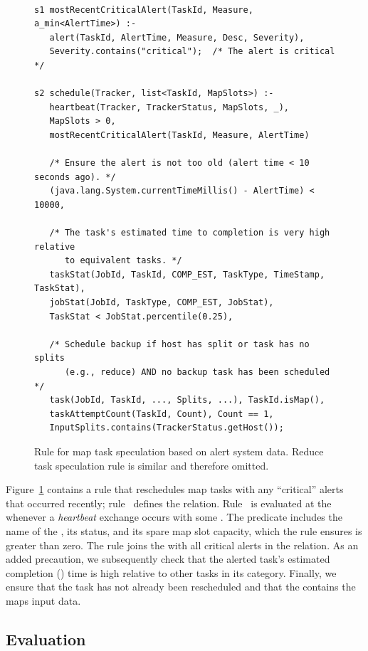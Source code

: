 \begin{figure}
\ssp
\centering
\begin{lstlisting}

s1 mostRecentCriticalAlert(TaskId, Measure, a_min<AlertTime>) :-
   alert(TaskId, AlertTime, Measure, Desc, Severity),
   Severity.contains("critical");  /* The alert is critical */

s2 schedule(Tracker, list<TaskId, MapSlots>) :-
   heartbeat(Tracker, TrackerStatus, MapSlots, _),
   MapSlots > 0,
   mostRecentCriticalAlert(TaskId, Measure, AlertTime)

   /* Ensure the alert is not too old (alert time < 10 seconds ago). */
   (java.lang.System.currentTimeMillis() - AlertTime) < 10000,

   /* The task's estimated time to completion is very high relative
      to equivalent tasks. */
   taskStat(JobId, TaskId, COMP_EST, TaskType, TimeStamp, TaskStat),
   jobStat(JobId, TaskType, COMP_EST, JobStat),
   TaskStat < JobStat.percentile(0.25),

   /* Schedule backup if host has split or task has no splits 
      (e.g., reduce) AND no backup task has been scheduled */
   task(JobId, TaskId, ..., Splits, ...), TaskId.isMap(),
   taskAttemptCount(TaskId, Count), Count == 1,
   InputSplits.contains(TrackerStatus.getHost());
\end{lstlisting}
\caption{\label{ch:hop:fig:speculation} 
Rule for map task speculation based on alert system data. Reduce task 
speculation rule is similar and therefore omitted. }
\end{figure}    
   
Figure~\ref{ch:hop:fig:speculation} contains a rule that reschedules map tasks
with any ``critical'' alerts that occurred recently; rule~ defines the
 relation.  Rule~ is evaluated at the \JT
whenever a {\em heartbeat} exchange occurs with some \TT.  The 
predicate includes the name of the \TT, its status, and its spare map slot
capacity, which the rule ensures is greater than zero.  The rule joins the
 with all critical alerts in the 
relation.  As an added precaution, we subsequently check that the alerted
task's estimated completion () time is high relative to other
tasks in its category.  Finally, we ensure that the task has not already been
rescheduled and that the \TT contains the maps input data.


\subsection{Evaluation}

